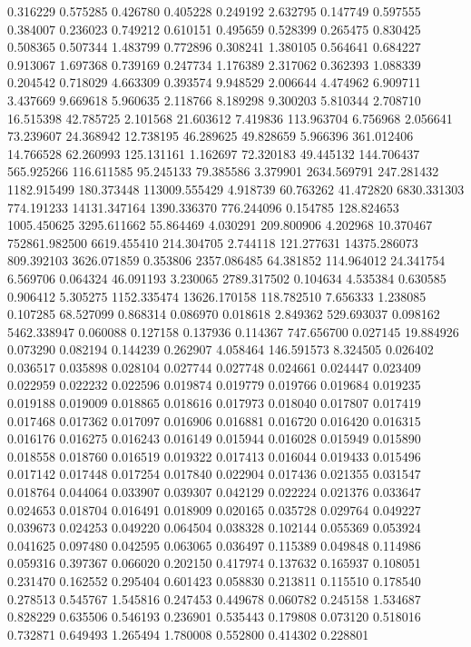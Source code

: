 0.316229
0.575285
0.426780
0.405228
0.249192
2.632795
0.147749
0.597555
0.384007
0.236023
0.749212
0.610151
0.495659
0.528399
0.265475
0.830425
0.508365
0.507344
1.483799
0.772896
0.308241
1.380105
0.564641
0.684227
0.913067
1.697368
0.739169
0.247734
1.176389
2.317062
0.362393
1.088339
0.204542
0.718029
4.663309
0.393574
9.948529
2.006644
4.474962
6.909711
3.437669
9.669618
5.960635
2.118766
8.189298
9.300203
5.810344
2.708710
16.515398
42.785725
2.101568
21.603612
7.419836
113.963704
6.756968
2.056641
73.239607
24.368942
12.738195
46.289625
49.828659
5.966396
361.012406
14.766528
62.260993
125.131161
1.162697
72.320183
49.445132
144.706437
565.925266
116.611585
95.245133
79.385586
3.379901
2634.569791
247.281432
1182.915499
180.373448
113009.555429
4.918739
60.763262
41.472820
6830.331303
774.191233
14131.347164
1390.336370
776.244096
0.154785
128.824653
1005.450625
3295.611662
55.864469
4.030291
209.800906
4.202968
10.370467
752861.982500
6619.455410
214.304705
2.744118
121.277631
14375.286073
809.392103
3626.071859
0.353806
2357.086485
64.381852
114.964012
24.341754
6.569706
0.064324
46.091193
3.230065
2789.317502
0.104634
4.535384
0.630585
0.906412
5.305275
1152.335474
13626.170158
118.782510
7.656333
1.238085
0.107285
68.527099
0.868314
0.086970
0.018618
2.849362
529.693037
0.098162
5462.338947
0.060088
0.127158
0.137936
0.114367
747.656700
0.027145
19.884926
0.073290
0.082194
0.144239
0.262907
4.058464
146.591573
8.324505
0.026402
0.036517
0.035898
0.028104
0.027744
0.027748
0.024661
0.024447
0.023409
0.022959
0.022232
0.022596
0.019874
0.019779
0.019766
0.019684
0.019235
0.019188
0.019009
0.018865
0.018616
0.017973
0.018040
0.017807
0.017419
0.017468
0.017362
0.017097
0.016906
0.016881
0.016720
0.016420
0.016315
0.016176
0.016275
0.016243
0.016149
0.015944
0.016028
0.015949
0.015890
0.018558
0.018760
0.016519
0.019322
0.017413
0.016044
0.019433
0.015496
0.017142
0.017448
0.017254
0.017840
0.022904
0.017436
0.021355
0.031547
0.018764
0.044064
0.033907
0.039307
0.042129
0.022224
0.021376
0.033647
0.024653
0.018704
0.016491
0.018909
0.020165
0.035728
0.029764
0.049227
0.039673
0.024253
0.049220
0.064504
0.038328
0.102144
0.055369
0.053924
0.041625
0.097480
0.042595
0.063065
0.036497
0.115389
0.049848
0.114986
0.059316
0.397367
0.066020
0.202150
0.417974
0.137632
0.165937
0.108051
0.231470
0.162552
0.295404
0.601423
0.058830
0.213811
0.115510
0.178540
0.278513
0.545767
1.545816
0.247453
0.449678
0.060782
0.245158
1.534687
0.828229
0.635506
0.546193
0.236901
0.535443
0.179808
0.073120
0.518016
0.732871
0.649493
1.265494
1.780008
0.552800
0.414302
0.228801

